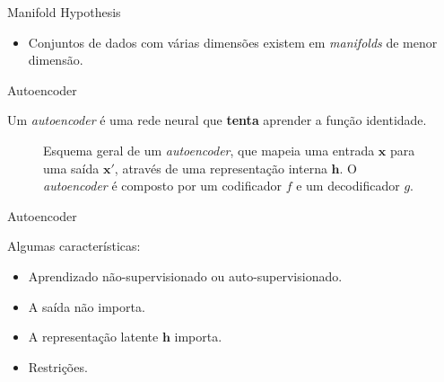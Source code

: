 \documentclass[dvipsnames]{beamer}
\begin{document}
\begin{frame}{Manifold Hypothesis}

    \begin{itemize}
        \item Conjuntos de dados com várias dimensões existem em \emph{manifolds} de menor dimensão.
    \end{itemize}

\end{frame}

\begin{frame}{Autoencoder}

	\justifying

	Um \emph{autoencoder} é uma rede neural que \textbf{tenta} aprender a função identidade.

	\begin{figure}

		\centering


		\caption{
			\justifying
			Esquema geral de um \emph{autoencoder}, que mapeia uma entrada $\boldsymbol{x}$ para uma saída $\boldsymbol{x'}$, através de uma representação interna $\boldsymbol{h}$.
			O \emph{autoencoder} é composto por um codificador $f$ e um decodificador $g$.
		}

	\end{figure}

\end{frame}

\begin{frame}{Autoencoder}

	Algumas características:

	\begin{itemize}
		\item Aprendizado não-supervisionado ou auto-supervisionado.
		\item A saída não importa.
		\item A representação latente $\boldsymbol{h}$ importa.
		\item Restrições.
	\end{itemize}

\end{frame}
\end{document}
